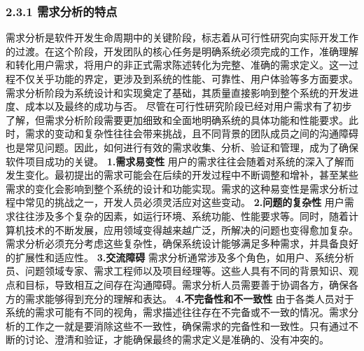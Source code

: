 \subsubsection{2.3.1 需求分析的特点}\label{ux9700ux6c42ux5206ux6790ux7684ux7279ux70b9}
需求分析是软件开发生命周期中的关键阶段，标志着从可行性研究向实际开发工作的过渡。在这个阶段，开发团队的核心任务是明确系统必须完成的工作，准确理解和转化用户需求，将用户的非正式需求陈述转化为完整、准确的需求定义。这一过程不仅关乎功能的界定，更涉及到系统的性能、可靠性、用户体验等多方面要求。需求分析阶段为系统设计和实现奠定了基础，其质量直接影响到整个系统的开发进度、成本以及最终的成功与否。
尽管在可行性研究阶段已经对用户需求有了初步了解，但需求分析阶段需要更加细致和全面地明确系统的具体功能和性能要求。此时，需求的变动和复杂性往往会带来挑战，且不同背景的团队成员之间的沟通障碍也是常见问题。因此，如何进行有效的需求收集、分析、验证和管理，成为了确保软件项目成功的关键。
\textbf{1.需求易变性}
用户的需求往往会随着对系统的深入了解而发生变化。最初提出的需求可能会在后续的开发过程中不断调整和增补，甚至某些需求的变化会影响到整个系统的设计和功能实现。需求的这种易变性是需求分析过程中常见的挑战之一，开发人员必须灵活应对这些变动。
\textbf{2.问题的复杂性}
用户需求往往涉及多个复杂的因素，如运行环境、系统功能、性能要求等。同时，随着计算机技术的不断发展，应用领域变得越来越广泛，所解决的问题也变得愈加复杂。需求分析必须充分考虑这些复杂性，确保系统设计能够满足多种需求，并具备良好的扩展性和适应性。
\textbf{3.交流障碍}
需求分析通常涉及多个角色，如用户、系统分析员、问题领域专家、需求工程师以及项目经理等。这些人具有不同的背景知识、观点和目标，导致相互之间存在沟通障碍。需求分析人员需要善于协调各方，确保各方的需求能够得到充分的理解和表达。
\textbf{4.不完备性和不一致性}
由于各类人员对于系统的需求可能有不同的视角，需求描述往往存在不完备或不一致的情况。需求分析的工作之一就是要消除这些不一致性，确保需求的完备性和一致性。只有通过不断的讨论、澄清和验证，才能确保最终的需求定义是准确的、没有冲突的。
